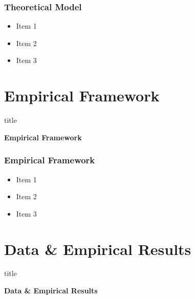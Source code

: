 \documentclass[11pt]{beamer}
\begin{document}
	\begin{frame}
		\frametitle{\bfseries Theoretical Model}
		\begin{itemize}
			\item Item 1
			\item Item 2
			\item Item 3
		\end{itemize}
		
	\end{frame}
	
	\section[Framework]{Empirical Framework}
	\begin{frame}
		\begin{beamercolorbox}{title}
			\begin{center}
				\bfseries \huge Empirical Framework
			\end{center}	
		\end{beamercolorbox}
		
	\end{frame}
	
	\begin{frame}
		
		\frametitle{\bfseries Empirical Framework}
		\begin{itemize}
			\item Item 1
			\item Item 2
			\item Item 3
		\end{itemize}
	\end{frame}
	
	\section[Data \& Results]{Data \& Empirical Results}
	\begin{frame}
		\begin{beamercolorbox}{title}
			\begin{center}
				\bfseries \huge Data \& Empirical Results
			\end{center}	
		\end{beamercolorbox}
		
	\end{frame}
	
\end{document}
